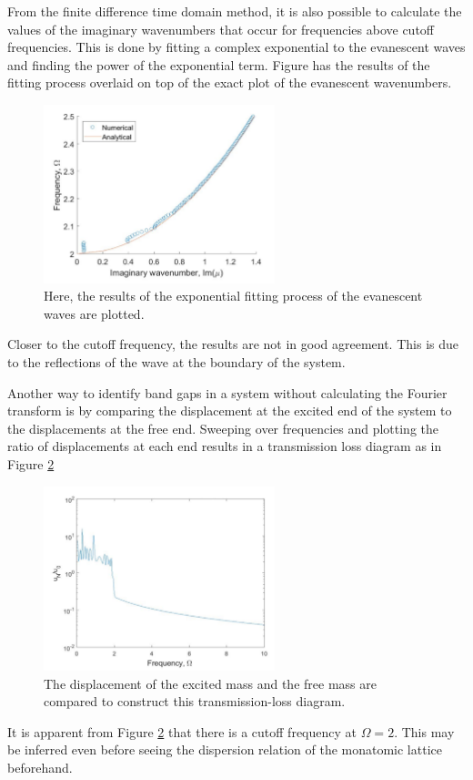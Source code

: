 \documentclass{article}
\begin{document}
From the finite difference time domain method, it is also possible to calculate 
the values of the imaginary wavenumbers that occur for frequencies above cutoff 
frequencies. This is done by fitting a complex exponential to the evanescent 
waves and finding the power of the exponential term. Figure  has the results of 
the fitting process overlaid on top of the exact plot of the evanescent 
wavenumbers. 
\begin{figure}[!htbp]
	\centering
	\includegraphics[width=0.6\textwidth]{im-wavenum-res.pdf}
	\caption{Here, the results of the exponential fitting process of the 
	evanescent waves are plotted.}
	\label{fig:imagwavenumres}
\end{figure}
Closer to the cutoff frequency, the results are not in good agreement. This is 
due to the reflections of the wave at the boundary of the system. 

Another way to identify band gaps in a system without calculating the Fourier 
transform is by comparing the displacement at the excited end of the system to 
the displacements at the free end. Sweeping over frequencies and plotting the 
ratio of displacements at each end results in a transmission loss diagram as in 
Figure \ref{fig:tlms}
\begin{figure}[!htbp]
	\centering
	\includegraphics[width=0.6\textwidth]{tl-diag.pdf}
	\caption{The displacement of the excited mass and the free mass are 
	compared to construct this transmission-loss diagram.}
	\label{fig:tlms}
\end{figure}
It is apparent from Figure \ref{fig:tlms} that there is a cutoff frequency at 
$\Omega=2$. This may be inferred even before seeing the dispersion relation of 
the monatomic lattice beforehand.
\end{document}
